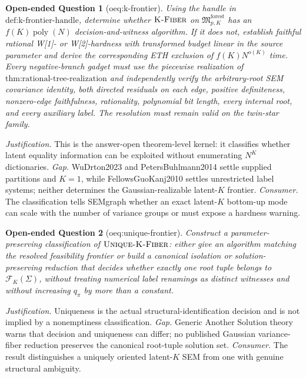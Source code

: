 \documentclass{article}
\newtheorem{openendedquestion}{Open-ended Question}
\begin{document}
\begin{openendedquestion}[oeq:k-frontier]\label{oeq:k-frontier}
Using the handle in \(\text{def:k-frontier-handle}\), determine whether \(\textsc{K-Fiber}\) on \(\mathfrak M_{p,K}^{\mathrm{forest}}\) has an \(f(K)\operatorname{poly}(N)\) decision-and-witness algorithm. If it does not, establish faithful rational W[1]- or W[2]-hardness with transformed budget linear in the source parameter and derive the corresponding ETH exclusion of \(f(K)N^{o(K)}\) time. Every negative-branch gadget must use the piecewise realization of \(\text{thm:rational-tree-realization}\) and independently verify the arbitrary-root SEM covariance identity, both directed residuals on each edge, positive definiteness, nonzero-edge faithfulness, rationality, polynomial bit length, every internal root, and every auxiliary label. The resolution must remain valid on the twin-star family.
\end{openendedquestion}
\par\smallskip\noindent \textit{Justification.} This is the answer-open theorem-level kernel: it classifies whether latent equality information can be exploited without enumerating \(N^{K}\) dictionaries. \textit{Gap.} WuDrton2023 and PetersBuhlmann2014 settle supplied partitions and \(K=1\), while FellowsGuoKanj2010 settles unrestricted label systems; neither determines the Gaussian-realizable latent-\(K\) frontier. \textit{Consumer.} The classification tells SEMgraph whether an exact latent-\(K\) bottom-up mode can scale with the number of variance groups or must expose a hardness warning.

\begin{openendedquestion}[oeq:unique-frontier]\label{oeq:unique-frontier}
Construct a parameter-preserving classification of \(\textsc{Unique-K-Fiber}\): either give an algorithm matching the resolved feasibility frontier or build a canonical isolation or solution-preserving reduction that decides whether exactly one root tuple belongs to \(\mathcal F_K(\Sigma)\), without treating numerical label renamings as distinct witnesses and without increasing \(q_\pi\) by more than a constant.
\end{openendedquestion}
\par\smallskip\noindent \textit{Justification.} Uniqueness is the actual structural-identification decision and is not implied by a nonemptiness classification. \textit{Gap.} Generic Another Solution theory warns that decision and uniqueness can differ; no published Gaussian variance-fiber reduction preserves the canonical root-tuple solution set. \textit{Consumer.} The result distinguishes a uniquely oriented latent-\(K\) SEM from one with genuine structural ambiguity.
\end{document}
